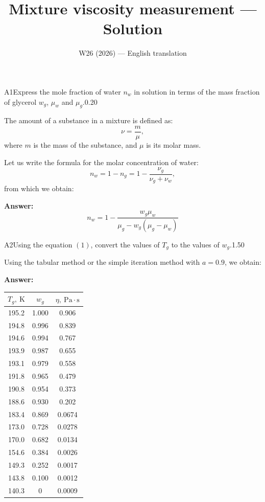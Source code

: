 \documentclass[11pt,a4paper]{article}
\title{\textbf{Mixture viscosity measurement --- Solution}}
\author{\normalsize W26 (2026) — English translation}
\date{}
\begin{document}
\maketitle\vspace{-0.5em}

\begin{solcard}{A1}{Express the mole fraction of water $n_w$ in solution in terms of the mass fraction of glycerol $w_g$, $\mu_w$ and $\mu_g$.}{0.20}

The amount of a substance in a mixture is defined as: \[\nu=\dfrac{m}{\mu},\] where $m$ is the mass of the substance, and $\mu$ is its molar mass. 

Let us write the formula for the molar concentration of water: \[n_w=1-n_g=1-\dfrac{\nu_g}{\nu_g+\nu_w},\] from which we obtain:

\par\smallskip\noindent\textbf{Answer:} \[n_w=1-\frac{w_g\mu_w}{\mu_g-w_g(\mu_g-\mu_w)}\]
\end{solcard}

\begin{solcard}{A2}{Using the equation $(1)$, convert the values of $T_g$ to the values of $w_g$.}{1.50}

Using the tabular method or the simple iteration method with $a=0.9$, we obtain:

\par\smallskip\noindent\textbf{Answer:} 
\begin{table}[H]
\centering
\begin{tabular}{|c|c|c|}
\hline
$T_g,~\mathrm{K}$ & $w_g$ & $\eta,~\mathrm{Pa}\cdot\mathrm{s}$ \\
\hline
195.2 & 1.000 & 0.906 \\
194.8 & 0.996 & 0.839 \\
194.6 & 0.994 & 0.767 \\
193.9 & 0.987 & 0.655 \\
193.1 & 0.979 & 0.558 \\
191.8 & 0.965 & 0.479 \\
190.8 & 0.954 & 0.373 \\
188.6 & 0.930 & 0.202 \\
183.4 & 0.869 & 0.0674 \\
173.0 & 0.728 & 0.0278 \\
170.0 & 0.682 & 0.0134 \\
154.6 & 0.384 & 0.0026 \\
149.3 & 0.252 & 0.0017 \\
143.8 & 0.100 & 0.0012 \\
140.3 & 0 & 0.0009 \\
\hline
\end{tabular}
\end{table}
\end{solcard}
\end{document}
